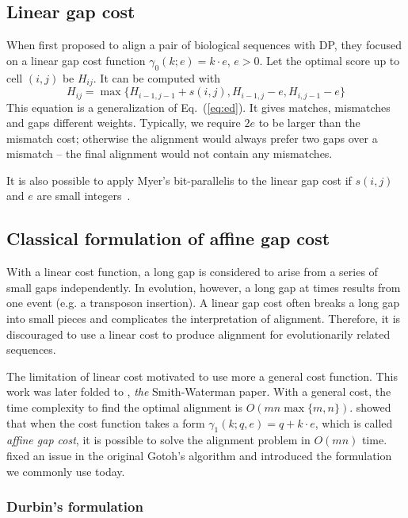 \documentclass{bioinfo}
\begin{document}
\subsection{Linear gap cost}

When \citet{Needleman:1970aa} first proposed to align a pair of biological
sequences with DP, they focused on a linear gap cost function
$\gamma_0(k;e)=k\cdot e$, $e>0$. Let the optimal score up to cell $(i,j)$ be
$H_{ij}$. It can be computed with
\begin{equation}\label{eq:linear}
H_{ij}=\max\{H_{i-1,j-1}+s(i,j), H_{i-1,j}-e, H_{i,j-1}-e\}
\end{equation}
This equation is a generalization of Eq.~(\ref{eq:ed}). It gives matches,
mismatches and gaps different weights.  Typically, we require $2e$ to be larger
than the mismatch cost; otherwise the alignment would always prefer two gaps
over a mismatch -- the final alignment would not contain any mismatches.

It is also possible to apply Myer's bit-parallelis to the linear gap cost
if $s(i,j)$ and $e$ are small integers~\citep{Loving:2014aa}.

\subsection{Classical formulation of affine gap cost}

With a linear cost function, a long gap is considered to arise from a series of
small gaps independently. In evolution, however, a long gap at times results
from one event (e.g. a transposon insertion). A linear gap cost often breaks a
long gap into small pieces and complicates the interpretation of alignment.
Therefore, it is discouraged to use a linear cost to produce alignment for
evolutionarily related sequences.

The limitation of linear cost motivated \citet{Waterman:1976aa} to use more
a general cost function. This work was later folded to \citet{Smith:1981aa},
\emph{the} Smith-Waterman paper. With a general cost, the time complexity to
find the optimal alignment is $O(mn\max\{m,n\})$. \citet{Gotoh:1982aa} showed
that when the cost function takes a form $\gamma_1(k;q,e)=q+k\cdot e$, which is
called \emph{affine gap cost}, it is possible to solve the alignment problem in
$O(mn)$ time. \citet{Altschul:1986aa} fixed an issue in the original Gotoh's
algorithm and introduced the formulation we commonly use today.

\subsubsection{Durbin's formulation}
\end{document}
